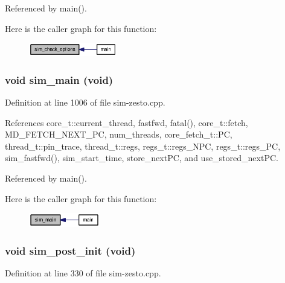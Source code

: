 Referenced by main().

Here is the caller graph for this function:\nopagebreak
\begin{figure}[H]
\begin{center}
\leavevmode
\includegraphics[width=109pt]{sim_8h_d6c7eccd0fa4b587be632b532e3b3e04_icgraph}
\end{center}
\end{figure}
\subsubsection[{sim\_\-main}]{\setlength{\rightskip}{0pt plus 5cm}void sim\_\-main (void)}\label{sim_8h_6b9951fa76e6d8b400f13df1c975ed3b}




Definition at line 1006 of file sim-zesto.cpp.

References core\_\-t::current\_\-thread, fastfwd, fatal(), core\_\-t::fetch, MD\_\-FETCH\_\-NEXT\_\-PC, num\_\-threads, core\_\-fetch\_\-t::PC, thread\_\-t::pin\_\-trace, thread\_\-t::regs, regs\_\-t::regs\_\-NPC, regs\_\-t::regs\_\-PC, sim\_\-fastfwd(), sim\_\-start\_\-time, store\_\-nextPC, and use\_\-stored\_\-nextPC.

Referenced by main().

Here is the caller graph for this function:\nopagebreak
\begin{figure}[H]
\begin{center}
\leavevmode
\includegraphics[width=88pt]{sim_8h_6b9951fa76e6d8b400f13df1c975ed3b_icgraph}
\end{center}
\end{figure}
\subsubsection[{sim\_\-post\_\-init}]{\setlength{\rightskip}{0pt plus 5cm}void sim\_\-post\_\-init (void)}\label{sim_8h_7af633ff74aee8f90ea9a610892191ce}




Definition at line 330 of file sim-zesto.cpp.

